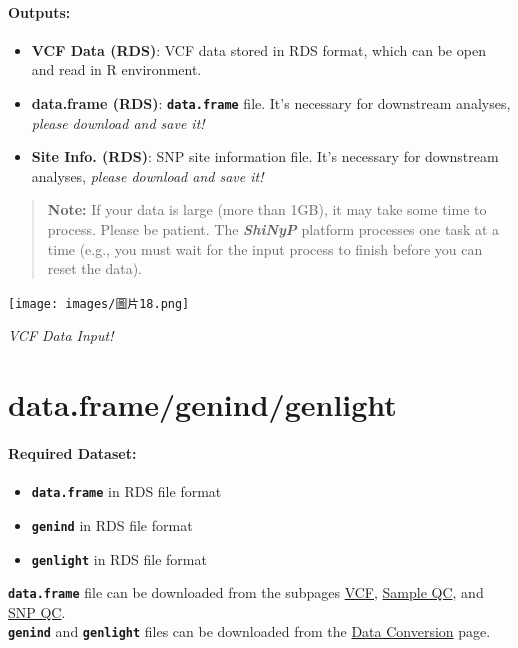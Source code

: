 \documentclass[
]{book}
\begin{document}
\paragraph*{Outputs:}\label{outputs}

\begin{itemize}
\item
  \textbf{VCF Data (RDS)}: VCF data stored in RDS format, which can be open and read in R environment.
\item
  \textbf{data.frame (RDS)}: {\textbf{\texttt{data.frame}}} file. It's necessary for downstream analyses, \emph{please download and save it!}
\item
  \textbf{Site Info. (RDS)}: SNP site information file. It's necessary for downstream analyses, \emph{please download and save it!}
\end{itemize}

\begin{quote}
\textbf{Note:} If your data is large (more than 1GB), it may take some time to process. Please be patient. The {\textbf{\emph{ShiNyP}}} platform processes one task at a time (e.g., you must wait for the input process to finish before you can reset the data).
\end{quote}

\texttt{[image: images/圖片18.png]}

\emph{VCF Data Input!}

\section{data.frame/genind/genlight}\label{data.framegenindgenlight}

\paragraph*{Required Dataset:}\label{required-dataset}

\begin{itemize}
\item
  {\textbf{\texttt{data.frame}}} in RDS file format
\item
  {\textbf{\texttt{genind}}} in RDS file format
\item
  {\textbf{\texttt{genlight}}} in RDS file format
\end{itemize}

{\textbf{\texttt{data.frame}}} file can be downloaded from the subpages \ul{VCF}, \ul{Sample QC}, and \ul{SNP QC}.\\
{\textbf{\texttt{genind}}} and {\textbf{\texttt{genlight}}} files can be downloaded from the \ul{Data Conversion} page.
\end{document}
